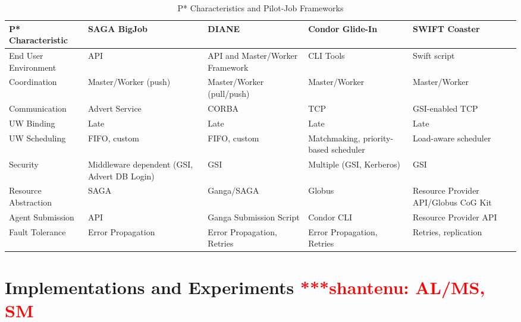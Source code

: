 \documentclass[conference,final]{IEEEtran}
\newcommand{\jhanote}[1]{ {\textcolor{red} { ***shantenu: #1 }}}
\newcommand{\jhanote}[1]{}
\begin{document}
\begin{table}[t]
\centering
\begin{tabular}{|l|p{2.5cm}|p{2.5cm}|p{2.5cm}|p{2.5cm}|}
	\hline
	\textbf{P* Characteristic}
	&\textbf{SAGA BigJob} &\textbf{DIANE} &\textbf{Condor Glide-In} &   
	\textbf{SWIFT Coaster} \\ \hline
End User Environment &API &API and Master/Worker Framework &CLI Tools &Swift script\\ \hline

Coordination &Master/Worker (push) &Master/Worker (pull/push) &Master/Worker &Master/Worker \\ \hline
	
Communication &Advert Service &CORBA &TCP &GSI-enabled TCP \\ \hline

UW Binding &Late &Late &Late &Late\\
\hline
UW Scheduling &FIFO, custom &FIFO, custom &Matchmaking, priority-based scheduler 
&Load-aware scheduler\\
\hline

Security &Middleware dependent (GSI, Advert DB Login) &GSI &Multiple (GSI, 
Kerberos) &GSI\\ \hline

Resource Abstraction &SAGA &Ganga/SAGA &Globus &Resource Provider API/Globus CoG 
Kit \\ 
\hline
Agent Submission &API &Ganga Submission Script &Condor CLI 
&Resource Provider API\\
\hline
Fault Tolerance &Error Propagation &Error Propagation, Retries &Error Propagation, Retries &Retries, replication\\
\hline
	
\end{tabular}
\caption{P* Characteristics and Pilot-Job Frameworks}\label{table:pilot-job-comparison}
\end{table}

\section{Implementations and Experiments \jhanote{AL/MS, SM}}
\end{document}
